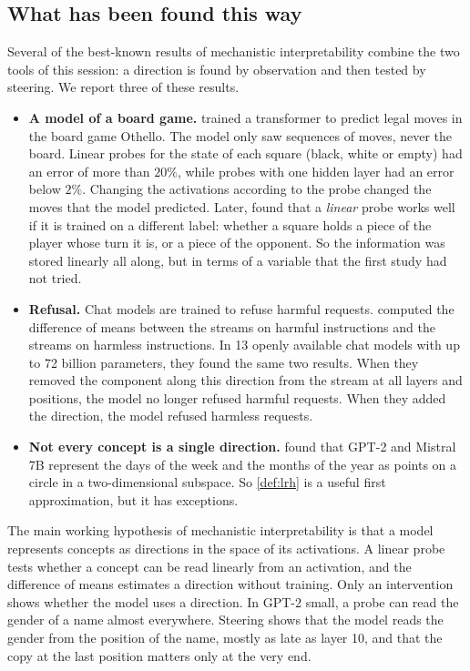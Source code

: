 \subsection{What has been found this way}

Several of the best-known results of mechanistic interpretability combine the two tools of this session: a
direction is found by observation and then tested by steering. We report three of these results.

\begin{itemize}
\item \textbf{A model of a board game.} \citet{li2023emergent} trained a transformer to predict legal moves in
the board game Othello. The model only saw sequences of moves, never the board. Linear probes for the state of each
square (black, white or empty) had an error of more than $20\%$, while probes with one hidden layer had an error
below $2\%$. Changing the activations according to the probe changed the moves that the model predicted. Later,
\citet{nanda2023emergent} found that a \emph{linear} probe works well if it is trained on a different label: whether
a square holds a piece of the player whose turn it is, or a piece of the opponent. So the information was stored
linearly all along, but in terms of a variable that the first study had not tried.
\item \textbf{Refusal.} Chat models are trained to refuse harmful requests. \citet{arditi2024refusal} computed
the difference of means between the streams on harmful instructions and the streams on harmless instructions. In 13
openly available chat models with up to 72 billion parameters, they found the same two results. When they removed
the component along this direction from the stream at all layers and positions, the model no longer refused
harmful requests. When they added the direction, the model refused harmless requests.
\item \textbf{Not every concept is a single direction.} \citet{engels2025not} found that GPT-2 and Mistral 7B
represent the days of the week and the months of the year as points on a circle in a two-dimensional subspace. So
\cref{def:lrh} is a useful first approximation, but it has exceptions.
\end{itemize}

\begin{takeaways}
The main working hypothesis of mechanistic interpretability is that a model represents concepts as directions in
the space of its activations. A linear probe tests whether a concept can be read linearly from an activation, and
the difference of means estimates a direction without training. Only an intervention shows whether the model uses
a direction. In GPT-2 small, a probe can read the gender of a name almost everywhere. Steering shows that the model
reads the gender from the position of the name, mostly as late as layer 10, and that the copy at the last position
matters only at the very end.
\end{takeaways}

